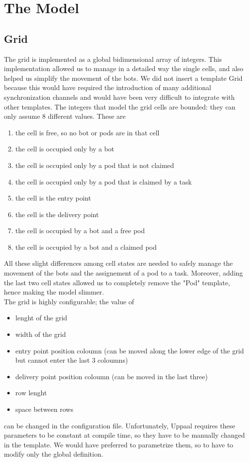 \documentclass[10pt,a4paper]{article}
\begin{document}
	\tableofcontents
	\clearpage
	
	\section{The Model}
		\subsection{Grid}
			The grid is implemented as a global bidimensional array of integers. This implementation allowed us to manage in a detailed way the single cells, and also helped us simplify the movement of the bots. We did not insert a template Grid because this would have required the introduction of many additional synchronization channels and would have been very difficult to integrate with other templates.
			The integers that model the grid cells are bounded: they can only assume 8 different values. These are
			\begin{enumerate}[start=0, label={\arabic* :}]
				\item the cell is free, so no bot or pods are in that cell
				\item the cell is occupied only by a bot
				\item the cell is occupied only by a pod that is not claimed
				\item the cell is occupied only by a pod that is claimed by a task 
				\item the cell is the entry point 
				\item the cell is the delivery point
				\item the cell is occupied by a bot and a free pod
				\item the cell is occupied by a bot and a claimed pod
			\end{enumerate}
			All these slight differences among cell states are needed to safely manage the movement of the bots and the assignement of a pod to a task. Moreover, adding the last two cell states allowed us to completely remove the "Pod" template, hence making the model slimmer.\\
			The grid is highly configurable; the value of
			\begin{itemize}
				\item lenght of the grid
				\item width of the grid
				\item entry point position coloumn (can be moved along the lower edge of the grid but cannot enter the last 3 coloumns) 
				\item delivery point position coloumn (can be moved in the last three)
				\item row lenght
				\item space between rows
			\end{itemize}
			can be changed in the configuration file. Unfortunately, Uppaal requires these parameters to be constant at compile time, so they have to be manually changed in the template. We would have preferred to parametrize them, so to have to modify only the global definition. 
			
\end{document}

